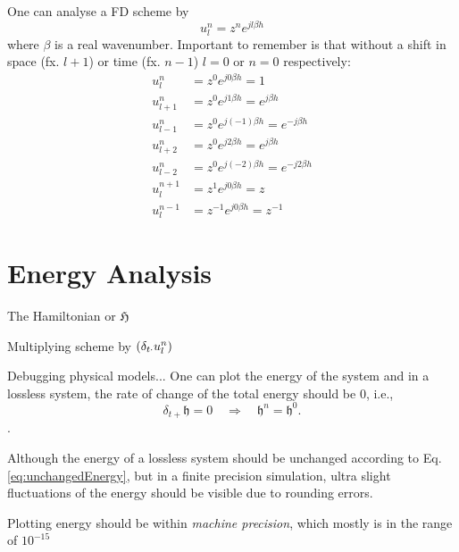 One can analyse a FD scheme by 
\begin{equation}
    u_l^n = z^n e^{jl\beta h}
\end{equation}
where $\beta$ is a real wavenumber. Important to remember is that without a shift in space (fx. $l+1$) or time (fx. $n-1$) $l = 0$ or $n=0$ respectively:
\begin{subequations} \label{eq:identitiesZ}
    \begin{align}
        u_l^n &= z^0 e^{j0\beta h} = 1\\
        u_{l+1}^n &= z^0 e^{j1\beta h} = e^{j\beta h}\\
        u_{l-1}^n &= z^0 e^{j(-1)\beta h} = e^{-j\beta h}\\
        u_{l+2}^n &= z^0 e^{j2\beta h} = e^{j\beta h}\\
        u_{l-2}^n &= z^0 e^{j(-2)\beta h}= e^{-j2\beta h}\\
        u_l^{n+1}&= z^1 e^{j0\beta h} = z\\
        u_l^{n-1}&= z^{-1} e^{j0\beta h} = z^{-1}
    \end{align}
\end{subequations}


\section{Energy Analysis}\label{sec:energyAnalysis}

The Hamiltonian or $\mathfrak{H}$

Multiplying scheme by $\left(\delta_{t\cdot} u_l^n \right)$

Debugging physical models...
One can plot the energy of the system and in a lossless system, the rate of change of the total energy should be 0, i.e.,
\begin{equation}\label{eq:unchangedEnergy}
    \delta_{t+}\mathfrak{h} = 0 \quad \Longrightarrow \quad \mathfrak{h}^n = \mathfrak{h}^0.
\end{equation}
.

Although the energy of a lossless system should be unchanged according to Eq. \eqref{eq:unchangedEnergy}, but in a finite precision simulation, ultra slight fluctuations of the energy should be visible due to rounding errors. 

Plotting energy should be within \textit{machine precision}, which mostly is in the range of $10^{-15}$

